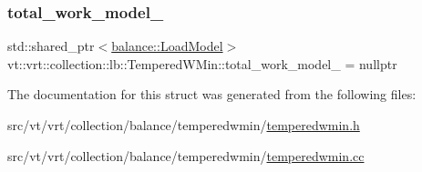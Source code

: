 \subsubsection{\texorpdfstring{total\+\_\+work\+\_\+model\+\_\+}{total\_work\_model\_}}
{\footnotesize\ttfamily std\+::shared\+\_\+ptr$<$\hyperlink{structvt_1_1vrt_1_1collection_1_1balance_1_1_load_model}{balance\+::\+Load\+Model}$>$ vt\+::vrt\+::collection\+::lb\+::\+Tempered\+W\+Min\+::total\+\_\+work\+\_\+model\+\_\+ = nullptr\hspace{0.3cm}{\ttfamily [private]}}



The documentation for this struct was generated from the following files\+:\begin{DoxyCompactItemize}
\item 
src/vt/vrt/collection/balance/temperedwmin/\hyperlink{temperedwmin_8h}{temperedwmin.\+h}\item 
src/vt/vrt/collection/balance/temperedwmin/\hyperlink{temperedwmin_8cc}{temperedwmin.\+cc}\end{DoxyCompactItemize}
